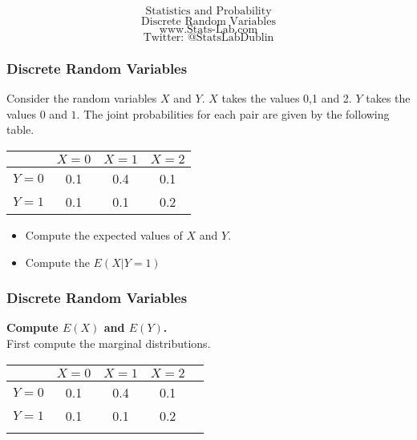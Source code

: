 \documentclass{beamer}
\begin{document}
\begin{frame}
\Huge
\[ \mbox{Statistics and Probability} \]
\LARGE
\[ \mbox{Discrete Random Variables} \]
\bigskip
\Large
\[ \mbox{www.Stats-Lab.com} \]
\[ \mbox{Twitter: @StatsLabDublin} \]
\bigskip

\end{frame}
\begin{frame}
\frametitle{Discrete Random Variables}
\Large
Consider the random variables $X$ and $Y$. $X$ takes the values 0,1 and 2. $Y$ takes the values $0$ and $1$.
The joint probabilities for each pair are given by the following table.
\begin{center}
\begin{tabular}{|c|c|c|c|}
\hline  & $X=0$ & $X=1$ & $X=2$  \\ 
\hline $Y=0$ & 0.1  & 0.4 & 0.1 \\ 
\hline  $Y=1$ & 0.1 & 0.1 & 0.2 \\ 
\hline 
\end{tabular} 
\end{center}
\begin{itemize}
\item Compute the expected values of $X$ and $Y$.
\item Compute the $E(X|Y=1)$
\end{itemize}

\end{frame}

\begin{frame}
\frametitle{Discrete Random Variables}
\Large
\vspace{-1.5cm}
\textbf{Compute $E(X)$ and $E(Y)$.}\\
First compute the marginal distributions.

\begin{center}
\begin{tabular}{|c|c|c|c||c|}
\hline  & $X=0$ & $X=1$ & $X=2$  &\phantom{spaces}\\ 
\hline $Y=0$ & 0.1  & 0.4 & 0.1 &\\ 
\hline  $Y=1$ & 0.1 & 0.1 & 0.2 & \\ \hline
\hline & & & & \\
\hline 
\end{tabular} 
\end{center}

\end{frame}
\end{document}
